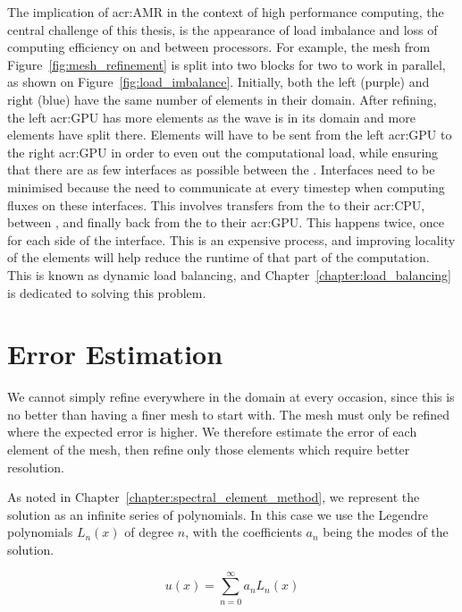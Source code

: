 The implication of \acrshort{acr:AMR} in the context of high performance computing, the central
challenge of this thesis, is the appearance of load imbalance and loss of computing efficiency on
and between processors. For example, the mesh from Figure~\ref{fig:mesh_refinement} is split into
two blocks for two  to work in parallel, as shown on
Figure~\ref{fig:load_imbalance}. Initially, both the left (purple) and right (blue)
 have the same number of elements in their domain. After refining, the left
\acrshort{acr:GPU} has more elements as the wave is in its domain and more elements have split
there. Elements will have to be sent from the left \acrshort{acr:GPU} to the right
\acrshort{acr:GPU} in order to even out the computational load, while ensuring that there are as few
interfaces as possible between the . Interfaces need to be minimised because the
 need to communicate at every timestep when computing fluxes on these
interfaces. This involves transfers from the  to their \acrshort{acr:CPU},
between , and finally back from the  to their
\acrshort{acr:GPU}. This happens twice, once for each side of the interface. This is an expensive
process, and improving locality of the elements will help reduce the runtime of that part of the
computation. This is known as dynamic load balancing, and Chapter~\ref{chapter:load_balancing} is
dedicated to solving this problem.

\section{Error Estimation}\label{section:adaptive_mesh_refinement:error_estimation}

We cannot simply refine everywhere in the domain at every occasion, since this is no better than
having a finer mesh to start with. The mesh must only be refined where the expected error is higher.
We therefore estimate the error of each element of the mesh, then refine only those elements which
require better resolution.

As noted in Chapter~\ref{chapter:spectral_element_method}, we represent the solution as an infinite
series of polynomials. In this case we use the Legendre polynomials \(L_n(x)\) of degree \(n\), with
the coefficients \(a_n\) being the modes of the solution.

\begin{equation} \label{equ:infinite_sum_amr}
	u(x) = \sum_{n = 0}^{\infty}a_n L_n(x)
\end{equation}


